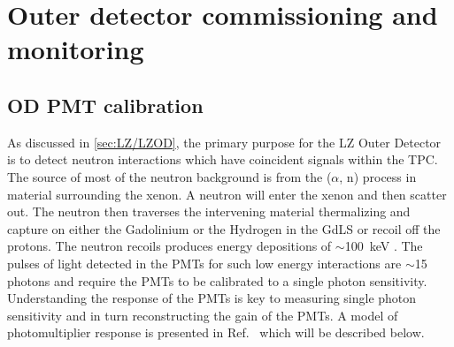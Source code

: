 \chapter{Outer detector commissioning and monitoring}\label{chap:ODCommissioning}
\section{OD PMT calibration}
As discussed in \autoref{sec:LZ/LZOD}, the primary purpose for the LZ Outer Detector is to detect neutron interactions which have coincident signals within the TPC. The source of most of the neutron background is from the ($\alpha$, n) process in material surrounding the xenon. A neutron will enter the xenon and then scatter out. The neutron then traverses the intervening material thermalizing and capture on either the Gadolinium or the Hydrogen in the GdLS or recoil off the protons. The neutron recoils produces energy depositions of $\sim$100~keV \cite{LZNIMA}. The pulses of light detected in the PMTs for such low energy interactions are $\sim$15 photons and require the PMTs to be calibrated to a single photon sensitivity. Understanding the response of the PMTs is key to measuring single photon sensitivity and in turn reconstructing the gain of the PMTs. A model of photomultiplier response is presented in Ref.~\cite{BELLAMY1994468} which will be described below.
